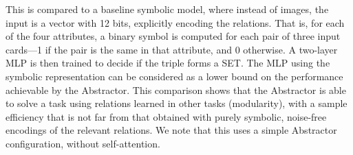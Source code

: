 This is compared to a baseline symbolic model, where instead of images, the input is a vector with 12 bits, explicitly encoding the relations. That is, for each of the four attributes, a binary symbol is computed for each pair of three input cards---1 if the pair is the same in that attribute, and 0 otherwise. A two-layer MLP is then trained to decide if the triple forms a SET. The MLP using the symbolic representation can be considered as a lower bound on the performance achievable by the Abstractor. This comparison shows that the Abstractor is able to solve a task using relations learned in other tasks (modularity), with a sample efficiency that is not far from that obtained 
with purely symbolic, noise-free encodings of the relevant relations. We note that this uses a simple Abstractor configuration, without self-attention.

